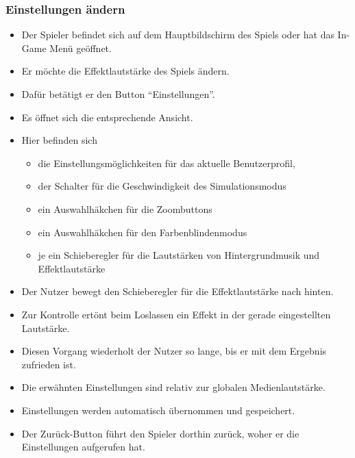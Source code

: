 \subsubsection{Einstellungen ändern}
\begin{itemize}
\item Der Spieler befindet sich auf dem Hauptbildschirm des Spiels oder hat das In-Game Menü 
geöffnet.
\item Er möchte die Effektlautstärke des Spiels ändern.
\item Dafür betätigt er den Button "`Einstellungen"'.
\item Es öffnet sich die entsprechende Ansicht.
\item Hier befinden sich
	\begin{itemize}
	\item die Einstellungsmöglichkeiten für das aktuelle Benutzerprofil, 
	\item der Schalter für die Geschwindigkeit des Simulationsmodus
	\item ein Auswahlhäkchen für die Zoombuttons
	\item ein Auswahlhäkchen für den Farbenblindenmodus
	\item je ein Schieberegler für die Lautstärken von Hintergrundmusik und Effektlautstärke
	\end{itemize}
\item Der Nutzer bewegt den Schieberegler für die Effektlautstärke nach hinten.
\item Zur Kontrolle ertönt beim Loslassen ein Effekt in der
gerade eingestellten Lautstärke.
\item Diesen Vorgang wiederholt der Nutzer so lange, bis er mit dem Ergebnis zufrieden ist.
\item Die erwähnten Einstellungen sind relativ zur globalen Medienlautstärke.
\item Einstellungen werden automatisch übernommen und gespeichert.
\item Der Zurück-Button führt den Spieler dorthin zurück, woher er die Einstellungen aufgerufen hat.
\end{itemize}
